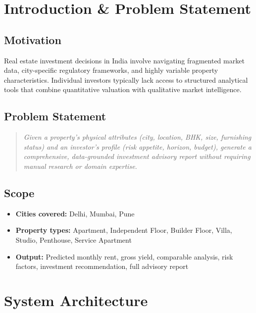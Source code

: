 \documentclass[12pt,a4paper]{article}
\begin{document}
\section{Introduction \& Problem Statement}

\subsection{Motivation}

Real estate investment decisions in India involve navigating fragmented market data, city-specific regulatory frameworks, and highly variable property characteristics. Individual investors typically lack access to structured analytical tools that combine quantitative valuation with qualitative market intelligence.

\subsection{Problem Statement}

\begin{quote}
\itshape
Given a property's physical attributes (city, location, BHK, size, furnishing status) and an investor's profile (risk appetite, horizon, budget), generate a comprehensive, data-grounded investment advisory report without requiring manual research or domain expertise.
\end{quote}

\subsection{Scope}

\begin{itemize}[leftmargin=1.5em]
  \item \textbf{Cities covered:} Delhi, Mumbai, Pune
  \item \textbf{Property types:} Apartment, Independent Floor, Builder Floor, Villa, Studio, Penthouse, Service Apartment
  \item \textbf{Output:} Predicted monthly rent, gross yield, comparable analysis, risk factors, investment recommendation, full advisory report
\end{itemize}

\section{System Architecture}
\end{document}

